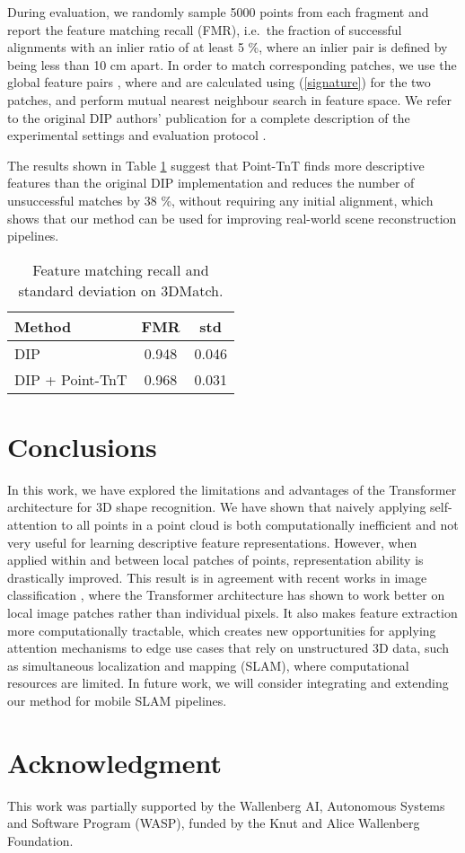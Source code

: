 \documentclass[a4paper,conference]{IEEEtran}
\begin{document}
During evaluation, we randomly sample 5000 points from each fragment and report the feature matching recall (FMR), i.e.\ the fraction of successful alignments with an inlier ratio of at least 5 \%, where an inlier pair is defined by being less than 10 cm apart. In order to match corresponding patches, we use the global feature pairs , where  and  are calculated using (\ref{signature}) for the two patches, and perform mutual nearest neighbour search in feature space. We refer to the original DIP authors' publication for a complete description of the experimental settings and evaluation protocol \cite{poiesi2021distinctive}.

The results shown in Table \ref{tab:fmr} suggest that Point-TnT finds more descriptive features than the original DIP implementation and reduces the number of unsuccessful matches by 38 \%, without requiring any initial alignment, which shows that our method can be used for improving real-world scene reconstruction pipelines.

\begin{table}
	\caption{Feature matching recall and standard deviation on 3DMatch.}
	\centering
	\begin{tabular}{lcc}
	\toprule
	\textbf{Method} & FMR & std \\
	\midrule
	DIP \cite{poiesi2021distinctive} & 0.948 & 0.046 \\
	DIP + Point-TnT & 0.968 & 0.031 \\
	\bottomrule
	\end{tabular}
	\label{tab:fmr}
\end{table}

\section{Conclusions}

In this work, we have explored the limitations and advantages of the Transformer architecture for 3D shape recognition. We have shown that naively applying self-attention to all points in a point cloud is both computationally inefficient and not very useful for learning descriptive feature representations. However, when applied within and between local patches of points, representation ability is drastically improved. This result is in agreement with recent works in image classification \cite{dosovitskiy2021image, han2021transformer}, where the Transformer architecture has shown to work better on local image patches rather than individual pixels. It also makes feature extraction more computationally tractable, which creates new opportunities for applying attention mechanisms to edge use cases that rely on unstructured 3D data, such as simultaneous localization and mapping (SLAM), where computational resources are limited. In future work, we will consider integrating and extending our method for mobile SLAM pipelines. 

\section*{Acknowledgment}
This work was partially supported by the Wallenberg AI, Autonomous Systems and Software Program (WASP), funded by the Knut and Alice Wallenberg Foundation. 





\end{document}
